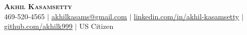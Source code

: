 
\begin{center}
    \textbf{\huge \scshape Akhil Kasamsetty} \\ \vspace{1pt}
    \small 469-520-4565 $|$ \href{mailto:akhilkasams@gmail.com}{\underline{akhilkasams@gmail.com}} $|$
    \href{https://linkedin.com/in/akhil-kasamsetty}{\underline{linkedin.com/in/akhil-kasamsetty}} $|$
    \href{https://github.com/akhilk999}{\underline{github.com/akhilk999}} $|$ \small US Citizen
\end{center}
